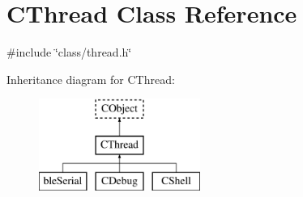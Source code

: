 \hypertarget{class_c_thread}{\section{C\-Thread Class Reference}
\label{class_c_thread}
}


{\ttfamily \#include \char`\"{}class/thread.\-h\char`\"{}}

Inheritance diagram for C\-Thread\-:\begin{figure}[H]
\begin{center}
\leavevmode
\includegraphics[height=3.000000cm]{d0/d26/class_c_thread}
\end{center}
\end{figure}
